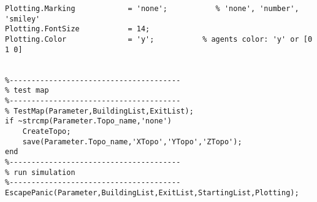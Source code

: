 \begin{lstlisting}[breaklines]
Plotting.Marking            = 'none';           % 'none', 'number', 'smiley'
Plotting.FontSize           = 14;
Plotting.Color              = 'y';           % agents color: 'y' or [0 1 0]


%---------------------------------------
% test map
%---------------------------------------
% TestMap(Parameter,BuildingList,ExitList);
if ~strcmp(Parameter.Topo_name,'none')
    CreateTopo;
    save(Parameter.Topo_name,'XTopo','YTopo','ZTopo');
end
%---------------------------------------
% run simulation
%---------------------------------------
EscapePanic(Parameter,BuildingList,ExitList,StartingList,Plotting);

\end{lstlisting}




